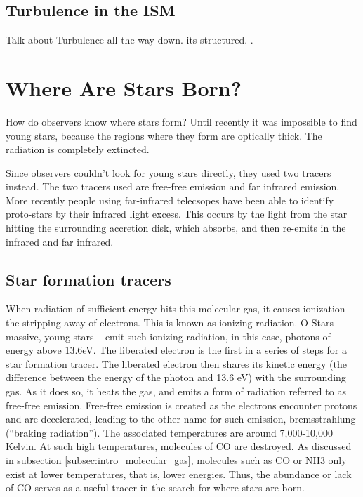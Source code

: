 \documentclass[../dissertation.tex]{subfiles}
\begin{document}
\subsection{Turbulence in the ISM}
Talk about Turbulence all the way down. its structured.
\citep[p. 52]{2009ARA&A..47...27K}.









\section{Where Are Stars Born?}
How do observers know where stars form?
Until recently it was impossible to find young stars, because the regions where they form are optically thick. 
The radiation is completely extincted.

Since observers couldn't look for young stars directly, they used two tracers instead. 
The two tracers used are free-free emission and far infrared emission.
More recently people using far-infrared telecsopes have been able to identify proto-stars by their infrared light excess. 
This occurs by the light from the star hitting the surrounding accretion disk, which absorbs, and then re-emits in the infrared and far infrared.
\subsection{Star formation tracers}

When radiation of sufficient energy hits this molecular gas, it causes ionization - the stripping away of electrons. 
This is known as ionizing radiation. 
O Stars -- massive, young stars -- emit such ionizing radiation, in this case, photons of energy above 13.6eV. 
The liberated electron is the first in a series of steps for a star formation tracer. 
The liberated electron then shares its kinetic energy (the difference between the energy of the photon and 13.6 eV) with the surrounding gas. 
As it does so, it heats the gas, and emits a form of radiation referred to as free-free emission. 
Free-free emission is created as the electrons encounter protons and are decelerated, leading to the other name for such emission, bremsstrahlung (``braking radiation''). 
The associated temperatures are around 7,000-10,000 Kelvin. 
At such high temperatures, molecules of CO are destroyed. 
As discussed in subsection \ref{subsec:intro_molecular_gas}, molecules such as CO or NH3 only exist at lower temperatures, that is, lower energies. 
Thus, the abundance or lack of CO serves as a useful tracer in the search for where stars are born.
\end{document}
